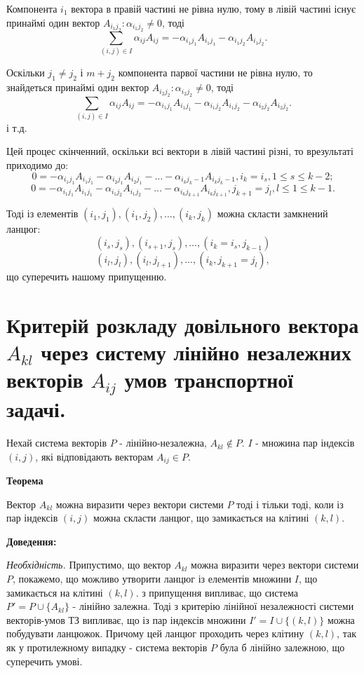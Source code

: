 \documentclass[12pt,a4paper]{report}
\begin{document}
Компонента $i_1$ вектора в правій частині не рівна нулю, тому в лівій частині існує принаймі один вектор $A_{{i_1}{j_2}}: \alpha_{{i_1}{j_2}}\neq0$, тоді 
$$\sum_{(i,j){\in}I}\alpha_{ij}A_{ij} = -\alpha_{{i_1}{j_1}}A_{{i_1}{j_1}}-\alpha_{{i_1}{j_2}}A_{{i_1}{j_2}}.$$

Оскільки $j_1 \neq j_2$ і $m + j_2$ компонента парвої частини не рівна нулю, то знайдеться принаймі один вектор $A_{{i_2}{j_2}}: \alpha_{{i_2}{j_2}} \neq 0$, тоді $$\sum_{(i,j) \in I}\alpha_{ij}A_{ij} = -\alpha_{{i_1}{j_1}}A_{{i_1}{j_1}}-\alpha_{{i_1}{j_2}}A_{{i_1}{j_2}}-\alpha_{{i_2}{j_2}}A_{{i_2}{j_2}}.$$
і т.д.

Цей процес скінченний, оскільки всі вектори в лівій частині різні, то врезультаті приходимо до:
$$0 = -\alpha_{{i_1}{j_1}}A_{{i_1}{j_1}}-\alpha_{{i_2}{j_1}}A_{{i_2}{j_1}}-\dots-\alpha_{{i_k}{j_k-1}}A_{{i_k}{j_k-1}}, i_k=i_s, 1 \leq s \leq k-2;$$
$$0 = -\alpha_{{i_1}{j_1}}A_{{i_1}{j_1}}-\alpha_{{i_1}{j_2}}A_{{i_1}{j_2}}-\dots-\alpha_{{i_k}{j_{k+1}}}A_{{i_k}{j_{k+1}}}, j_{k+1}=j_l, l \leq 1 \leq k-1.$$

Тоді із елементів $(i_1,j_1), (i_1,j_2), \dots, (i_k,j_k)$ можна скласти замкнений ланцюг:
$$(i_s,j_s), (i_{s+1},j_s), \dots, (i_k = i_s, j_{k-1})$$
$$(i_l,j_l), (i_l,j_{l+1}), \dots, (i_k, j_{k+1} = j_l),$$
що суперечить нашому припущенню.

\clearpage

\chapter{Критерій розкладу довільного вектора $A_{kl}$ через систему лінійно незалежних векторів $A_{ij}$ умов транспортної задачі.}

Нехай система векторів $P$ - лінійно-незалежна, $A_{kl} \notin P$. $I$ - множина пар індексів $(i,j)$, які відповідають векторам $A_{ij} \in P$.

{\bf Теорема}

Вектор $A_{kl}$ можна виразити через вектори системи $P$ тоді і тільки тоді, коли із пар індексів $(i,j)$ можна скласти ланцюг, що замикається на клітині $(k,l)$.

{\bf Доведення:}

{\it Необхідність.} Припустимо, що вектор $A_{kl}$ можна виразити через вектори системи $P$, покажемо, що можливо утворити ланцюг із елементів множини $I$, що замикається на клітині $(k,l)$. з припущення випливає, що система $P'=P \cup \{A_{kl}\}$ - лінійно залежна. Тоді з критерію лінійної незалежності системи векторів-умов ТЗ випливає, що із пар індексів множини $I'=I \cup \{(k,l)\}$ можна побудувати ланцюжок. Причому цей ланцюг проходить через клітину $(k,l)$, так як у протилежному випадку - система векторів $P$ була б лінійно залежною, що суперечить умові.
\end{document}
